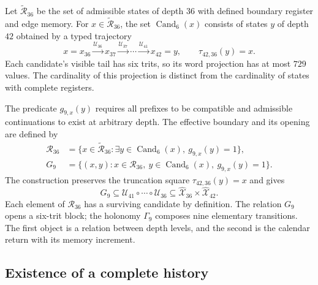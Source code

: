 Let $\widetilde{\mathcal R}_{36}$ be the set of admissible states of depth $36$ with defined boundary register and edge memory. For $x\in\widetilde{\mathcal R}_{36}$, the set $\operatorname{Cand}_6(x)$ consists of states $y$ of depth $42$ obtained by a typed trajectory
\[
 x=x_{36}\xrightarrow{\mathcal U_{36}}x_{37}
 \xrightarrow{\mathcal U_{37}}\cdots
 \xrightarrow{\mathcal U_{41}}x_{42}=y,
 \qquad \tau_{42,36}(y)=x.
\]
Each candidate's visible tail has six trits, so its word projection has at most $729$ values. The cardinality of this projection is distinct from the cardinality of states with complete registers.

The predicate $g_{9,x}(y)$ requires all prefixes to be compatible and admissible continuations to exist at arbitrary depth. The effective boundary and its opening are defined by
\begin{align*}
 \mathcal R_{36}
 &=\{x\in\widetilde{\mathcal R}_{36}:
      \exists y\in\operatorname{Cand}_6(x),\ g_{9,x}(y)=1\},\\
 G_9&=\{(x,y):x\in\mathcal R_{36},\
                y\in\operatorname{Cand}_6(x),\ g_{9,x}(y)=1\}.
\end{align*}
The construction preserves the truncation square $\tau_{42,36}(y)=x$ and gives
\[
 G_9\subseteq\mathcal U_{41}\circ\cdots\circ\mathcal U_{36}
 \subseteq\widehat{\mathcal X}_{36}\times\widehat{\mathcal X}_{42}.
\]
Each element of $\mathcal R_{36}$ has a surviving candidate by definition. The relation $G_9$ opens a six-trit block; the holonomy $\Gamma_9$ composes nine elementary transitions. The first object is a relation between depth levels, and the second is the calendar return with its memory increment.

\subsection{Existence of a complete history}

